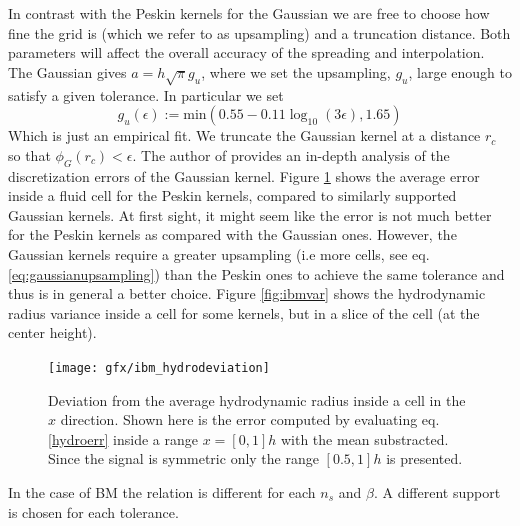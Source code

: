 \documentclass[ twoside,openright,titlepage,numbers=noenddot,%
headinclude,footinclude,cleardoublepage=empty,abstract=on,
BCOR=5mm,paper=a4,fontsize=11pt, dvipsnames
]{scrreprt}
\begin{document}
In contrast with the Peskin kernels for the Gaussian we are free to choose how fine the grid is (which we refer to as upsampling) and a truncation distance. Both parameters will affect the overall accuracy of the spreading and interpolation. The Gaussian gives $a=h \sqrt{\pi} g_u$, where we set the upsampling, $g_u$, large enough to satisfy a given tolerance. In particular we set
\begin{equation}
  \label{eq:gaussianupsampling}
  g_u(\epsilon) := \text{min}\left(0.55 -0.11 \log_{10}(3\epsilon), 1.65\right)
\end{equation}
Which is just an empirical fit.
We truncate the Gaussian kernel at a distance $r_c$ so that $\phi_G(r_c) < \epsilon$. The author of \cite{Keaveny2014} provides an in-depth analysis of the discretization errors of the Gaussian kernel.
Figure \ref{fig:ibm_hydrovar} shows the average error inside a fluid cell for the Peskin kernels, compared to similarly supported Gaussian kernels. At first sight, it might seem like the error is not much better for the Peskin kernels as compared with the Gaussian ones. However, the Gaussian kernels require a greater upsampling (i.e more cells, see eq. \eqref{eq:gaussianupsampling}) than the Peskin ones to achieve the same tolerance and thus is in general a better choice. Figure \ref{fig:ibmvar} shows the hydrodynamic radius variance inside a cell for some kernels, but in a slice of the cell (at the center height).
\begin{figure}
\label{fig:ibm_hydrovar}
\texttt{[image: gfx/ibm\_hydrodeviation]}
  \caption{Deviation from the average hydrodynamic radius inside a cell in the $x$ direction. Shown here is the error computed by evaluating eq. \eqref{hydroerr} inside a range $x=[0, 1]h$ with the mean substracted. Since the signal is symmetric only the range $[0.5, 1]h$ is presented.}
\end{figure}
In the case of BM the relation is different for each $n_s$ and $\beta$. A different support is chosen for each tolerance. 
\end{document}

